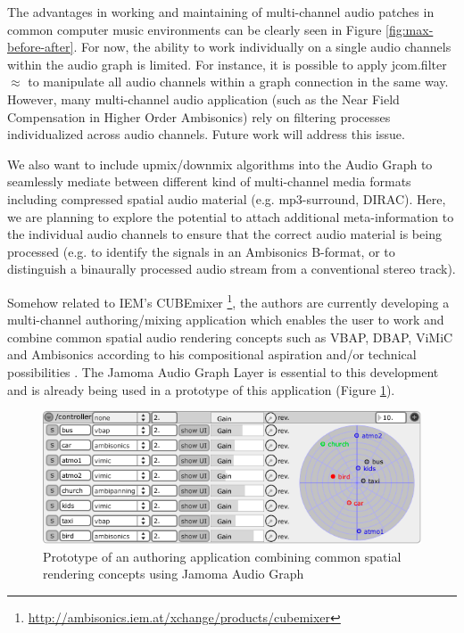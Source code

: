 \documentclass[twoside,a4paper]{article}
\begin{document}
The advantages in working and maintaining of multi-channel audio patches in common computer music environments can be clearly seen in Figure \ref{fig:max-before-after}. 
For now, the ability to work individually on a single audio channels within the audio graph is limited.
For instance, it is possible to apply jcom.filter$\approx$ to manipulate all audio channels within a graph connection in the same way. However, many multi-channel audio application (such as the Near Field Compensation in Higher Order Ambisonics) rely on filtering processes individualized across audio channels. Future work will address this issue.

We also want to include upmix/downmix algorithms into the Audio Graph to seamlessly mediate between different kind of multi-channel media formats including compressed spatial audio material (e.g. mp3-surround, DIRAC). Here, we are planning to explore the potential to attach additional meta-information to the individual audio channels to ensure that the correct audio material is being processed (e.g. to identify the signals in an Ambisonics B-format, or to distinguish a binaurally processed audio stream from a conventional stereo track). 

Somehow related to IEM's CUBEmixer \footnote{\url{http://ambisonics.iem.at/xchange/products/cubemixer}}, the authors are currently developing a multi-channel authoring/mixing application which enables the user to work and combine common spatial audio rendering concepts such as VBAP, DBAP, ViMiC \cite{Peters:2008b} and Ambisonics according to his compositional aspiration and/or technical possibilities \cite{Peters:2009}. The Jamoma Audio Graph Layer is essential to this development and is already being used in a prototype of this application (Figure \ref{fig:SceneMixer}).
\begin{figure}[htbp]
	\centering
		\includegraphics[width=1\columnwidth]{SceneMixer.png}
	\caption{Prototype of an authoring application combining common spatial rendering concepts using Jamoma Audio Graph}
	\label{fig:SceneMixer}
\end{figure}
\end{document}
